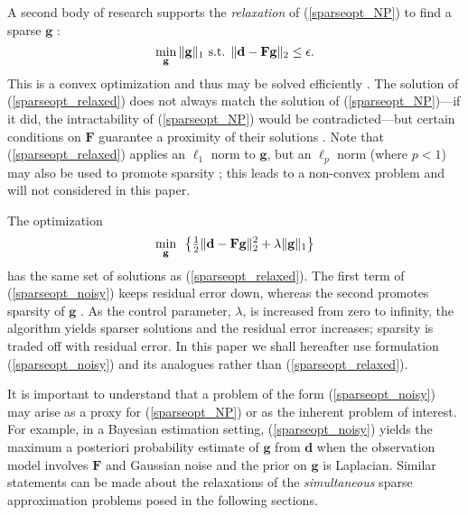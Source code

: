\documentclass[final]{siamltex}
\newcommand{\la}[1]{\mbox{$\mathbf{#1}$}}  \newcommand{\sst}[1]{\mbox{\scriptsize{#1}}}
\begin{document}
   A second body of research supports the {\em{relaxation}} of 
   (\ref{sparseopt_NP}) to find a sparse \la{g} \cite{Che1998}:
   \begin{equation}\label{sparseopt_relaxed}
   \mathop{\mbox{min}}_{\mbox{\scriptsize{\la{g}}}}
                      \Vert \la{g} \Vert_1
                         \text{ s.t. }
                      \Vert \la{d} - \la{F}\la{g} \Vert_2 \leq \epsilon.
   \end{equation}
   This is a convex optimization and thus may be solved efficiently
   \cite{Boy2004}.  The solution of (\ref{sparseopt_relaxed}) does not
   always match the solution of (\ref{sparseopt_NP})---if it did, the
   intractability of (\ref{sparseopt_NP}) would be contradicted---but
   certain conditions on $\la{F}$ guarantee a proximity of their
   solutions \cite{Don2006b, Don2006c, Tro2006_convexIT}.
   Note that (\ref{sparseopt_relaxed}) applies an $\ell_1$ norm to
   $\la{g}$, but an $\ell_p$ norm (where $p < 1$) may also be used to
   promote sparsity \cite{Gor1997, Che1998}; this leads to a
   non-convex problem and will not considered in this paper.

   The optimization
   \begin{equation}\label{sparseopt_noisy}
   \mathop{\mbox{min}}_{\mbox{\scriptsize{\la{g}}}} \mbox{  }
                  \left \{
                        \tfrac{1}{2} \Vert \la{d} - \la{F}\la{g} \Vert _2^2
                      +     \lambda  \Vert \la{g} \Vert _1
                  \right \}
   \end{equation}
   has the same set of solutions as (\ref{sparseopt_relaxed}).  The
   first term of (\ref{sparseopt_noisy}) keeps residual error down,
   whereas the second promotes sparsity of \la{g} \cite{Tib1996,
   Che1998}.  As the control parameter, $\lambda$, is increased from
   zero to infinity, the algorithm yields sparser solutions and the
   residual error increases; sparsity is traded off with residual
   error.  In this paper we shall hereafter use formulation
   (\ref{sparseopt_noisy}) and its analogues rather than
   (\ref{sparseopt_relaxed}).

   It is important to understand that a problem of the form
   (\ref{sparseopt_noisy}) may arise as a proxy for (\ref{sparseopt_NP})
   or as the inherent problem of interest.  For example,
   in a Bayesian estimation setting, (\ref{sparseopt_noisy})
   yields the maximum a posteriori probability estimate of
   $\la{g}$ from $\la{d}$ when the observation model involves $\la{F}$
   and Gaussian noise and the prior on $\la{g}$ is Laplacian.
   Similar statements can be made about the relaxations of the
   \emph{simultaneous} sparse approximation problems posed in the
   following sections.
\end{document}
